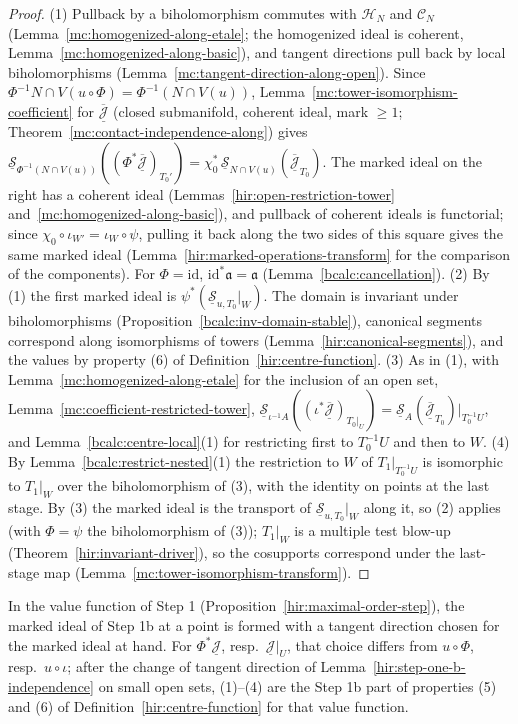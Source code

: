 \begin{proof}
\leanok
(1) Pullback by a biholomorphism commutes with \(\mathcal H_N\) and \(\mathcal C_N\) (Lemma~\ref{mc:homogenized-along-etale}; the homogenized ideal is coherent,
Lemma~\ref{mc:homogenized-along-basic}), and tangent directions pull back by local biholomorphisms (Lemma~\ref{mc:tangent-direction-along-open}). Since
\(\Phi^{-1}N\cap V(u\circ\Phi)=\Phi^{-1}(N\cap V(u))\), Lemma~\ref{mc:tower-isomorphism-coefficient} for \(\overline{\underline{\mathcal J}}\) (closed submanifold, coherent ideal,
mark \(\ge1\); Theorem~\ref{mc:contact-independence-along}) gives
\(\underline{\mathcal S}_{\Phi^{-1}(N\cap V(u))}((\Phi^*\overline{\underline{\mathcal J}})_{T_0'})=\chi_0^*\,\underline{\mathcal S}_{N\cap V(u)}(\overline{\underline{\mathcal J}}_{T_0})\).
The marked ideal on the right has a coherent ideal (Lemmas~\ref{hir:open-restriction-tower} and~\ref{mc:homogenized-along-basic}), and pullback of coherent ideals is
functorial; since \(\chi_0\circ\iota_{W'}=\iota_W\circ\psi\), pulling it back along the two sides of this square gives the same marked ideal
(Lemma~\ref{hir:marked-operations-transform} for the comparison of the components). For \(\Phi=\mathrm{id}\), \(\mathrm{id}^*\mathfrak a=\mathfrak a\)
(Lemma~\ref{bcalc:cancellation}).
(2) By (1) the first marked ideal is \(\psi^*(\underline{\mathcal S}_{u,T_0}|_W)\). The domain is invariant under biholomorphisms (Proposition~\ref{bcalc:inv-domain-stable}),
canonical segments correspond along isomorphisms of towers (Lemma~\ref{hir:canonical-segments}), and the values by property (6) of
Definition~\ref{hir:centre-function}.
(3) As in (1), with Lemma~\ref{mc:homogenized-along-etale} for the inclusion of an open set, Lemma~\ref{mc:coefficient-restricted-tower},
\(\underline{\mathcal S}_{\iota^{-1}A}((\iota^*\overline{\underline{\mathcal J}})_{T_0|_U})=\underline{\mathcal S}_A(\overline{\underline{\mathcal J}}_{T_0})|_{T_0^{-1}U}\), and
Lemma~\ref{bcalc:centre-local}(1) for restricting first to \(T_0^{-1}U\) and then to \(W\).
(4) By Lemma~\ref{bcalc:restrict-nested}(1) the restriction to \(W\) of \(T_1|_{T_0^{-1}U}\) is isomorphic to \(T_1|_W\) over the biholomorphism of (3), with the identity on
points at the last stage. By (3) the marked ideal is the transport of \(\underline{\mathcal S}_{u,T_0}|_W\) along it, so (2) applies (with \(\Phi=\psi\) the biholomorphism
of (3)); \(T_1|_W\) is a multiple test blow-up (Theorem~\ref{hir:invariant-driver}), so the cosupports correspond under the last-stage map
(Lemma~\ref{mc:tower-isomorphism-transform}).
\end{proof}
In the value function of Step 1 (Proposition~\ref{hir:maximal-order-step}), the marked ideal of Step 1b at a point is formed with a tangent direction chosen for the
marked ideal at hand. For \(\Phi^*\underline{\mathcal J}\), resp.\ \(\underline{\mathcal J}|_U\), that choice differs from \(u\circ\Phi\), resp.\ \(u\circ\iota\); after the
change of tangent direction of Lemma~\ref{hir:step-one-b-independence} on small open sets, (1)--(4) are the Step 1b part of properties (5) and (6) of
Definition~\ref{hir:centre-function} for that value function.

